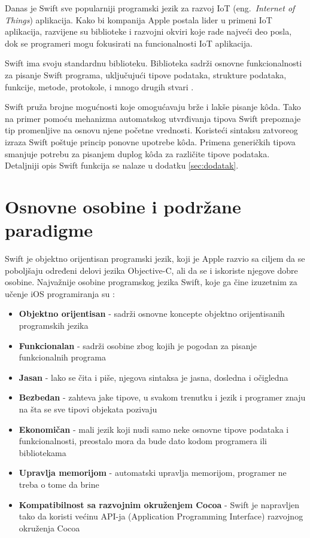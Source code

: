 \documentclass[a4paper]{article}
\begin{document}
Danas je Swift sve popularniji programski jezik za razvoj IoT (eng.~{\em Internet of Things}) aplikacija. Kako bi kompanija Apple postala lider u primeni IoT aplikacija, razvijene su biblioteke i razvojni okviri koje rade najveći deo posla, dok se programeri mogu fokusirati na funcionalnosti IoT aplikacija.

Swift ima svoju standardnu biblioteku. Biblioteka sadrži osnovne funkcionalnosti za pisanje Swift programa, uključujući tipove podataka, strukture podataka, funkcije, metode, protokole, i mnogo drugih stvari \cite{naucni_rad}.

Swift pruža brojne mogućnosti koje omogućavaju brže i lakše pisanje k\^{o}da. Tako na primer pomoću mehanizma automatskog utvrđivanja tipova Swift prepoznaje tip promenljive na osnovu njene početne vrednosti. Koristeći sintaksu zatvoreog izraza Swift poštuje princip ponovne upotrebe k\^{o}da. Primena generičkih tipova smanjuje potrebu za pisanjem duplog k\^{o}da za različite tipove podataka. Detaljniji opis Swift funkcija se nalaze u dodatku \ref{sec:dodatak}.


\section{Osnovne osobine i podržane paradigme}	
\label{sec:cetvrtiDeo}
Swift je objektno orijentisan programski jezik, koji je Apple razvio sa ciljem da se poboljšaju određeni delovi jezika Objective-C, ali da se i iskoriste njegove dobre osobine. Najvažnije osobine programskog jezika Swift, koje ga čine izuzetnim za učenje iOS programiranja su \cite{swift_programming}:

\begin{itemize}
\item\textbf{Objektno orijentisan} - sadrži osnovne koncepte objektno orijentisanih programskih jezika
\item\textbf{Funkcionalan} - sadrži osobine zbog kojih je pogodan za pisanje funkcionalnih programa
\item\textbf{Jasan} - lako se čita i piše, njegova sintaksa je jasna, dosledna i očigledna
\item\textbf{Bezbedan} - zahteva jake tipove, u svakom trenutku i jezik i programer znaju na šta se sve tipovi objekata pozivaju
\item\textbf{Ekonomičan} - mali jezik koji nudi samo neke osnovne tipove podataka i funkcionalnosti, preostalo mora da bude dato kodom programera ili bibliotekama
\item\textbf{Upravlja memorijom} - automatski upravlja memorijom, programer ne treba o tome da brine
\item\textbf{Kompatibilnost sa razvojnim okruženjem Cocoa} -  Swift je napravljen tako da koristi većinu API-ja (Application Programming Interface) razvojnog okruženja Cocoa
\end{itemize}
\end{document}
